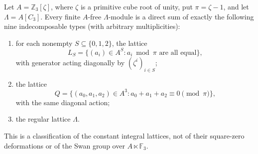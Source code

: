 \begin{proposition}
\label{C:cyclotomic_C3_lattices}
Let $A=\mathbb Z_3[\zeta]$, where $\zeta$ is a primitive cube
root of unity, put $\pi=\zeta-1$, and let $\Lambda=A[C_3]$.
Every finite $A$-free $\Lambda$-module is a direct sum of exactly
the following nine indecomposable types (with arbitrary
multiplicities):
\begin{enumerate}
\item for each nonempty $S\subseteq\{0,1,2\}$, the lattice
\[
 L_S=\{(a_i)\in A^S: a_i\bmod\pi\text{ are all equal}\},
\]
with generator acting diagonally by $(\zeta^i)_{i\in S}$;
\item the lattice
\[
 Q=\{(a_0,a_1,a_2)\in A^3:
                    a_0+a_1+a_2\equiv0\pmod\pi\},
\]
with the same diagonal action;
\item the regular lattice $\Lambda$.
\end{enumerate}
This is a classification of the constant integral lattices, not
of their square-zero deformations or of the Swan group over
$A\ltimes\mathbb F_3$.
\end{proposition}
